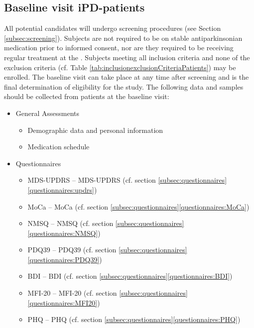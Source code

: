\subsection{Baseline visit \ac{iPD}-patients}
All potential candidates will undergo screening procedures (see Section \ref{subsec:screening}). Subjects are not required to be on stable antiparkinsonian medication prior to informed consent, nor are they required to be receiving regular treatment at the \UKM{}. Subjects meeting all inclusion criteria and none of the exclusion criteria (cf. Table \ref{tab:inclusionexclusionCriteriaPatients}) may be enrolled. The baseline visit can take place at any time after screening and is the final determination of eligibility for the study. The following data and samples should be collected from patients at the baseline visit:
\begin{itemize}[noitemsep,topsep=0pt]
\item General Assessments
\begin{itemize}[noitemsep,topsep=0pt]
\item Demographic data and personal information
\item Medication schedule
\end{itemize}
\item Questionnaires
\begin{itemize}[noitemsep,topsep=0pt]
\item \acl{MDS-UPDRS} -- \acs{MDS-UPDRS} (cf. section \ref{subsec:questionnaires}\ref{questionnaires:updrs})
\item \acl{MoCa} -- \acs{MoCa} (cf. section \ref{subsec:questionnaires}\ref{questionnaires:MoCa})
\item \acl{NMSQ} -- \acs{NMSQ} (cf. section \ref{subsec:questionnaires}\ref{questionnaires:NMSQ})
\item \acl{PDQ39} -- \acs{PDQ39} (cf. section \ref{subsec:questionnaires}\ref{questionnaires:PDQ39})
\item \acl{BDI} -- \acs{BDI} (cf. section \ref{subsec:questionnaires}\ref{questionnaires:BDI})
\item \acl{MFI-20} -- \acs{MFI-20} (cf. section \ref{subsec:questionnaires}\ref{questionnaires:MFI20})
\item \acl{PHQ} -- \acs{PHQ} (cf. section \ref{subsec:questionnaires}\ref{questionnaires:PHQ})

\end{itemize}
\end{itemize}
